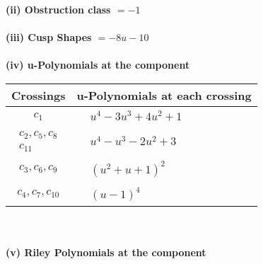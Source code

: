\documentclass[1p]{elsarticle_modified}
\theoremstyle{definition}
\begin{document}
\flushleft \textbf{(ii) Obstruction class $= -1$}\\~\\
\flushleft \textbf{(iii) Cusp Shapes $= -8 u-10$}\\~\\
\newpage\renewcommand{\arraystretch}{1}
\flushleft \textbf{(iv) u-Polynomials at the component}\newline \\
\begin{tabular}{m{50pt}|m{274pt}}
Crossings & \hspace{64pt}u-Polynomials at each crossing \\
\hline $$\begin{aligned}c_{1}\end{aligned}$$&$\begin{aligned}
&u^4-3 u^3+4 u^2+1
\end{aligned}$\\
\hline $$\begin{aligned}c_{2},c_{5},c_{8}\\c_{11}\end{aligned}$$&$\begin{aligned}
&u^4- u^3-2 u^2+3
\end{aligned}$\\
\hline $$\begin{aligned}c_{3},c_{6},c_{9}\end{aligned}$$&$\begin{aligned}
&(u^2+u+1)^2
\end{aligned}$\\
\hline $$\begin{aligned}c_{4},c_{7},c_{10}\end{aligned}$$&$\begin{aligned}
&(u-1)^4
\end{aligned}$\\
\hline
\end{tabular}\\~\\
\newpage\renewcommand{\arraystretch}{1}
\flushleft \textbf{(v) Riley Polynomials at the component}\newline \\
\end{document}
